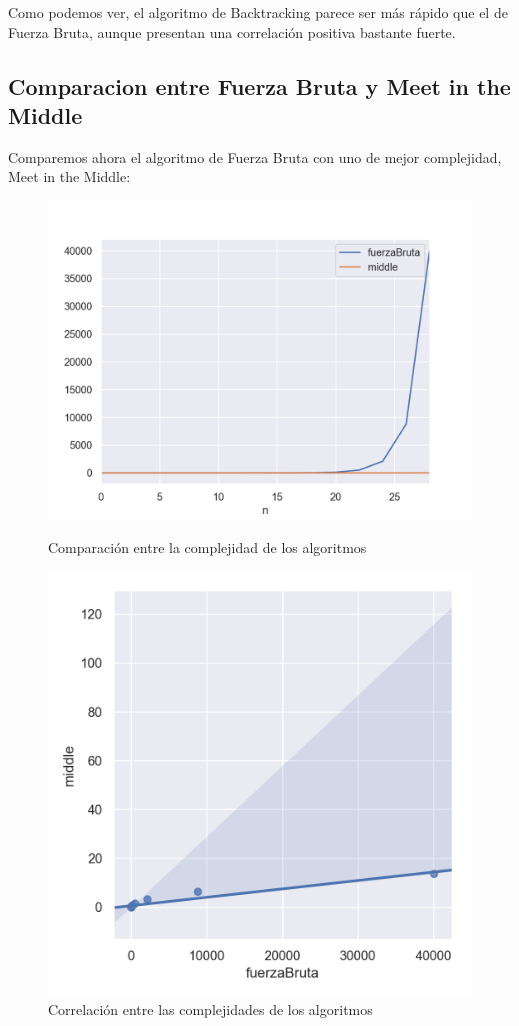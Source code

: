 Como podemos ver, el algoritmo de Backtracking parece ser más rápido que el de Fuerza Bruta, aunque presentan una correlación positiva bastante fuerte.

\subsection{Comparacion entre Fuerza Bruta y Meet in the Middle}
Comparemos ahora el algoritmo de Fuerza Bruta con uno de  mejor complejidad, Meet in the Middle:

\begin{figure}[H]
   \begin{minipage}{0.5\textwidth}
     \centering
     \includegraphics[width=0.9\linewidth]{img/fb_vs_middle_1}
     \caption{Comparación entre la complejidad de los algoritmos}
   \end{minipage}\hfill
   \begin{minipage}{0.5\textwidth}
     \centering
     \includegraphics[width=0.9\linewidth]{img/fb_vs_middle_2}
     \caption{Correlación entre las complejidades de los algoritmos}
   \end{minipage}
\end{figure}

